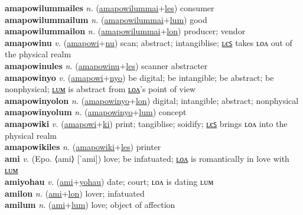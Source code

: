 \textbf{amapowilummailes} \textit{n.} (\hyperref[amapowilummai]{amapowilummai}+\hyperref[les]{les})
consumer \label{amapowilummailes} \\
\textbf{amapowilummailum} \textit{n.} (\hyperref[amapowilummai]{amapowilummai}+\hyperref[lum]{lum})
good \label{amapowilummailum} \\
\textbf{amapowilummailon} \textit{n.} (\hyperref[amapowilummai]{amapowilummai}+\hyperref[lon]{lon})
producer; vendor \label{amapowilummailon} \\
\textbf{amapowinu} \textit{v.} (\hyperref[amapowi]{amapowi}+\hyperref[nu]{nu})
scan; abstract; intangiblise; \hyperref[amapowinules]{ʟєꜱ} takes ʟᴏᴧ out of the physical realm \label{amapowinu} \\
\textbf{amapowinules} \textit{n.} (\hyperref[amapowinu]{amapowinu}+\hyperref[les]{les})
scanner abstracter \label{amapowinules} \\
\textbf{amapowinyo} \textit{v.} (\hyperref[amapowi]{amapowi}+\hyperref[nyo]{nyo})
be digital; be intangible; be abstract; be nonphysical; \hyperref[amapowinyolum]{ʟᴜᴍ} is abstract from \hyperref[amapowinyolon]{ʟᴏᴧ}’s point of view \label{amapowinyo} \\
\textbf{amapowinyolon} \textit{n.} (\hyperref[amapowinyo]{amapowinyo}+\hyperref[lon]{lon})
digital; intangible; abstract; nonphysical \label{amapowinyolon} \\
\textbf{amapowinyolum} \textit{n.} (\hyperref[amapowinyo]{amapowinyo}+\hyperref[lum]{lum})
concept \label{amapowinyolum} \\
\textbf{amapowiki} \textit{v.} (\hyperref[amapowi]{amapowi}+\hyperref[ki]{ki})
print; tangiblise; soidify; \hyperref[amapowikiles]{ʟєꜱ} brings ʟᴏᴧ into the physical realm \label{amapowiki} \\
\textbf{amapowikiles} \textit{n.} (\hyperref[amapowiki]{amapowiki}+\hyperref[les]{les})
printer \label{amapowikiles} \\
\textbf{ami} \textit{v.} (Epo. ⟨ami⟩ [ˈami])
love; be infatuated; \hyperref[amilon]{ʟᴏᴧ} is romantically in love with \hyperref[amilum]{ʟᴜᴍ} \label{ami} \\
\textbf{amiyohau} \textit{v.} (\hyperref[ami]{ami}+\hyperref[yohau]{yohau})
date; court; ʟᴏᴧ is dating ʟᴜᴍ \label{amiyohau} \\
\textbf{amilon} \textit{n.} (\hyperref[ami]{ami}+\hyperref[lon]{lon})
lover; infatuated \label{amilon} \\
\textbf{amilum} \textit{n.} (\hyperref[ami]{ami}+\hyperref[lum]{lum})
love; object of affection \label{amilum} \\
